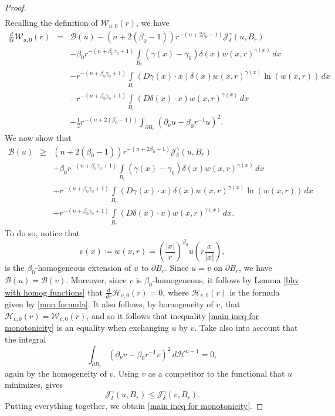 \documentclass[reqno,11pt]{amsart}
\newcommand{\1}{\mathds{1}}
\numberwithin{equation}{section}
\begin{document}
\begin{proof}
\begin{eqnarray*}
\end{eqnarray*}
Recalling the definition of $\mathcal{W}_{u,0}(r)$, we have
\begin{eqnarray*}
  \frac{d}{dr}\mathcal{W}_{u,0}(r)& =  & \mathcal{B}(u) -(n + 2(\beta_0-1))r^{-(n + 2\beta_0-1)}\mathcal{J}_\delta^\gamma(u,B_r)\\
  & &  - \beta_0 r^{-(n+\beta_0 \gamma_0 +1)}\int\limits_{B_r}(\gamma(x)-\gamma_0)\delta(x)w(x,r)^{\gamma(x)} \,dx\\
&  & - r^{-(n+\beta_0 \gamma_0 + 1)}\int\limits_{B_r}\left(D\gamma(x)\cdot x\right) \delta(x) w(x,r)^{\gamma(x)}  \ln(w(x,r)) \, dx\\
&  & -  r^{-(n+\beta_0 \gamma_0 + 1)}\int\limits_{B_r} (D\delta(x) \cdot x) w(x,r)^{\gamma(x)}  \, dx\\
& & + \frac{1}{2} r^{-(n+2(\beta_0-1))}\int_{\partial B_r}(\partial_\nu u - \beta_0r^{-1} u)^2.
\end{eqnarray*}
We now show that 
\begin{eqnarray}
  \mathcal{B}(u) & \geq &  (n + 2(\beta_0-1))r^{-(n + 2\beta_0-1)}\mathcal{J}_\delta^\gamma(u,B_r) \nonumber\\ 
  & &  + \beta_0 r^{-(n+\beta_0 \gamma_0 +1)}\int\limits_{B_r}(\gamma(x)-\gamma_0)\delta(x)w(x,r)^{\gamma(x)} \,dx \nonumber\\ 
&  & + r^{-(n+\beta_0 \gamma_0 + 1)}\int\limits_{B_r}\left(D\gamma(x)\cdot x\right) \delta(x) w(x,r)^{\gamma(x)}  \ln(w(x,r)) \, dx \nonumber\\ 
&  & +  r^{-(n+\beta_0 \gamma_0 + 1)}\int\limits_{B_r} (D\delta(x) \cdot x) w(x,r)^{\gamma(x)}  \, dx. \label{main ineq for monotonicity}
\end{eqnarray}
To do so, notice that
$$
	v(x) \coloneqq w(x,r) = \left(\frac{|x|}{r}\right)^{\beta_0}u\left(r\frac{x}{|x|}\right),
$$
is the $\beta_0$-homogeneous extension of $u$ to $\partial B_r$. Since $u = v$ on $\partial B_r$, we have $\mathcal{B}(u) = \mathcal{B}(v)$. Moreover, since $v$ is $\beta_0$-homogeneous, it follows by Lemma \ref{bhv with homog functions} that $\frac{d}{dr}\mathcal{H}_{v,0}(r) = 0$, where $\mathcal{H}_{v,0}(r)$ is the formula given by \eqref{mon formula}.  It also follows, by homogeneity of $v$, that $\mathcal{H}_{v,0}(r) = \mathcal{W}_{v,0}(r)$, and so it follows that inequality \eqref{main ineq for monotonicity} is an equality when exchanging $u$ by $v$. Take also into account that the integral
$$
	\int_{\partial B_r}(\partial_\nu v - \beta_0 r^{-1}v)^2\,d\mathcal{H}^{n-1} = 0,
$$
again by the homogeneity of $v$. Using $v$ as a competitor to the functional that $u$ minimizes, gives
$$
	\mathcal{J}_\delta^\gamma(u,B_r) \leq \mathcal{J}_\delta^\gamma(v,B_r).
$$
Putting everything together, we obtain \eqref{main ineq for monotonicity}.
\end{proof}
\end{document}

